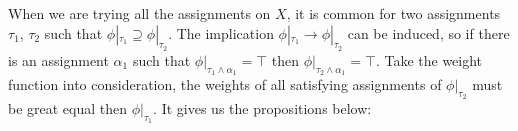     When we are trying all the assignments on $X$, it is common for two assignments $\tau_1$, $\tau_2$ such that $\phi|_{\tau_1} \supseteq \phi|_{\tau_2}$. The implication $\phi|_{\tau_1} \rightarrow \phi|_{\tau_2}$ can be induced, so if there is an assignment $\alpha_1$ such that $\phi|_{\tau_1 \wedge \alpha_1} = \top$ then $\phi|_{\tau_2 \wedge \alpha_1} = \top$. Take the weight function	into consideration, the weights of all satisfying assignments of $\phi|_{\tau_2}$ must be great equal then $\phi|_{\tau_1}$. It gives us the propositions below:
\fi